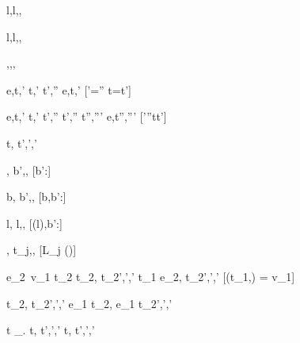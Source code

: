   { }
  {\Change l,\sigma \normalise \Change l,\sigma,\nothing}

  { }
  {\Watch l,\sigma \normalise \Watch l,\sigma,\nothing}

  { }
  {\Fail,\sigma \normalise \Fail,\sigma,\nothing}






    {e,\sigma \eval t,\sigma' \Quad
     t,\sigma' \stride t',\sigma''}
    {e,\sigma \normalise t,\sigma'}
    [\sigma'=\sigma'' \land t=t']

    {e,\sigma \eval t,\sigma'  \Quad
     t,\sigma' \stride t',\sigma''  \Quad
     t',\sigma'' \normalise t'',\sigma'''}
    {e,\sigma \normalise t'',\sigma'''}
    [\sigma'\neq \sigma''\vee t\neq t']





  {t,\sigma {} t',\sigma',\delta'}



  { }
  {\Enter \beta,\sigma {} \Update b',\sigma,\nothing}
  [b':\beta]

  { }
  {\Update b,\sigma {} \Update b',\sigma,\nothing}
  [b,b':\beta]

  { }
  {\Change l,\sigma {} \Change l,\sigma[l \mapsto b'],}
  [\sigma(l),b':\beta]



	{ }
	{\Pick{},\sigma {} t_j,\sigma,\nothing}
  [L_j \in \Picks(\Pick{})]



	{e_2\ v_1 \eval t_2 \Quad
   t_2,\sigma {} t_2',\sigma',\delta'}
  {t_1 \Step e_2,\sigma {} t_2',\sigma',\delta'}
  [\Value(t_1,\sigma) = v_1]



	{t_2,\sigma {} t_2',\sigma',\delta'}
	{e_1 \Trans t_2,\sigma {} e_1 \Trans t_2',\sigma',\delta'}

  {t \Step \lambda\_. \Forever t,\sigma {} t',\sigma',\delta'}
  {\Forever t,\sigma {} t',\sigma',\delta'}

